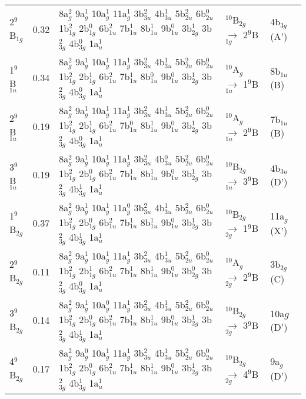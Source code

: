 \begin{refsection}
\begin{center}
\begin{landscape}
\begin{longtable}{@{\extracolsep{\fill}}lllll}
	2$^9$B$_{1g}$    & 0.32 & 8a$_g^2$ 9a$_g^1$ 10a$_g^1$ 11a$_g^1$ 3b$_{3u}^2$ 4b$_{3u}^1$ 5b$_{2u}^2$ 6b$_{2u}^0$ 1b$_{1g}^2$ 2b$_{1g}^0$ 6b$_{1u}^2$ 7b$_{1u}^1$ 8b$_{1u}^1$ 9b$_{1u}^0$ 3b$_{2g}^1$ 3b$_{3g}^2$ 4b$_{3g}^0$ 1a$_u^1$ & $^{10}$B$_{2g}$ $\longrightarrow$ 2$^9$B$_{1g}$    & 4b$_{3g}$ (A')   \\
	1$^9$B$_{1u}$    & 0.34 & 8a$_g^2$ 9a$_g^1$ 10a$_g^1$ 11a$_g^1$ 3b$_{3u}^2$ 4b$_{3u}^1$ 5b$_{2u}^2$ 6b$_{2u}^0$ 1b$_{1g}^2$ 2b$_{1g}^1$ 6b$_{1u}^2$ 7b$_{1u}^1$ 8b$_{1u}^0$ 9b$_{1u}^0$ 3b$_{2g}^1$ 3b$_{3g}^2$ 4b$_{3g}^0$ 1a$_u^1$ & $^{10}$A$_g$    $\longrightarrow$ 1$^9$B$_{1u}$    & 8b$_{1u}$ (B)    \\
	2$^9$B$_{1u}$    & 0.19 & 8a$_g^2$ 9a$_g^1$ 10a$_g^1$ 11a$_g^1$ 3b$_{3u}^2$ 4b$_{3u}^1$ 5b$_{2u}^2$ 6b$_{2u}^0$ 1b$_{1g}^2$ 2b$_{1g}^1$ 6b$_{1u}^2$ 7b$_{1u}^0$ 8b$_{1u}^1$ 9b$_{1u}^0$ 3b$_{2g}^1$ 3b$_{3g}^2$ 4b$_{3g}^0$ 1a$_u^1$ & $^{10}$A$_g$    $\longrightarrow$ 2$^9$B$_{1u}$    & 7b$_{1u}$ (B)    \\
	3$^9$B$_{1u}$    & 0.19 & 8a$_g^2$ 9a$_g^1$ 10a$_g^1$ 11a$_g^1$ 3b$_{3u}^2$ 4b$_{3u}^0$ 5b$_{2u}^2$ 6b$_{2u}^0$ 1b$_{1g}^2$ 2b$_{1g}^0$ 6b$_{1u}^2$ 7b$_{1u}^1$ 8b$_{1u}^1$ 9b$_{1u}^0$ 3b$_{2g}^1$ 3b$_{3g}^2$ 4b$_{3g}^1$ 1a$_u^1$ & $^{10}$B$_{2g}$ $\longrightarrow$ 3$^9$B$_{1u}$    & 4b$_{3u}$ (D')   \\
	1$^9$B$_{2g}$    & 0.37 & 8a$_g^2$ 9a$_g^1$ 10a$_g^1$ 11a$_g^0$ 3b$_{3u}^2$ 4b$_{3u}^1$ 5b$_{2u}^2$ 6b$_{2u}^0$ 1b$_{1g}^2$ 2b$_{1g}^0$ 6b$_{1u}^2$ 7b$_{1u}^1$ 8b$_{1u}^1$ 9b$_{1u}^0$ 3b$_{2g}^1$ 3b$_{3g}^2$ 4b$_{3g}^1$ 1a$_u^1$ & $^{10}$B$_{2g}$ $\longrightarrow$ 1$^9$B$_{2g}$   & 11a$_g$ (X')   \\
	2$^9$B$_{2g}$    & 0.11 & 8a$_g^2$ 9a$_g^1$ 10a$_g^1$ 11a$_g^1$ 3b$_{3u}^2$ 4b$_{3u}^1$ 5b$_{2u}^2$ 6b$_{2u}^0$ 1b$_{1g}^2$ 2b$_{1g}^1$ 6b$_{1u}^2$ 7b$_{1u}^1$ 8b$_{1u}^1$ 9b$_{1u}^0$ 3b$_{2g}^0$ 3b$_{3g}^2$ 4b$_{3g}^0$ 1a$_u^1$ & $^{10}$A$_g$    $\longrightarrow$ 2$^9$B$_{2g}$    & 3b$_{2g}$  (C)   \\
	3$^9$B$_{2g}$    & 0.14 & 8a$_g^2$ 9a$_g^1$ 10a$_g^0$ 11a$_g^1$ 3b$_{3u}^2$ 4b$_{3u}^1$ 5b$_{2u}^2$ 6b$_{2u}^0$ 1b$_{1g}^2$ 2b$_{1g}^0$ 6b$_{1u}^2$ 7b$_{1u}^1$ 8b$_{1u}^1$ 9b$_{1u}^0$ 3b$_{2g}^1$ 3b$_{3g}^2$ 4b$_{3g}^1$ 1a$_u^1$ & $^{10}$B$_{2g}$ $\longrightarrow$ 3$^9$B$_{2g}$    & 10a$g$ (D')   \\
	4$^9$B$_{2g}$    & 0.17 & 8a$_g^2$ 9a$_g^0$ 10a$_g^1$ 11a$_g^1$ 3b$_{3u}^2$ 4b$_{3u}^1$ 5b$_{2u}^2$ 6b$_{2u}^0$ 1b$_{1g}^2$ 2b$_{1g}^0$ 6b$_{1u}^2$ 7b$_{1u}^1$ 8b$_{1u}^1$ 9b$_{1u}^0$ 3b$_{2g}^1$ 3b$_{3g}^2$ 4b$_{3g}^1$ 1a$_u^1$ & $^{10}$B$_{2g}$ $\longrightarrow$ 4$^9$B$_{2g}$    & 9a$_g$ (D')    \\

\end{longtable}
\end{landscape}
\end{center}
\end{refsection}
